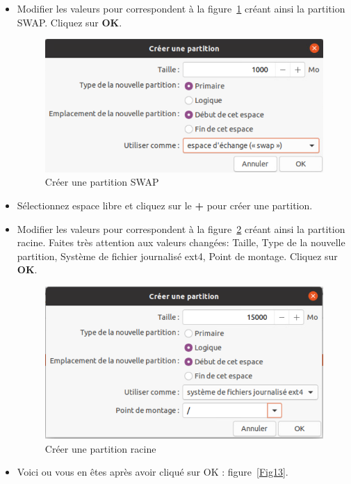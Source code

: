\begin{itemize}
		\item Modifier les valeurs pour correspondent à la figure~\ref{Fig11} créant ainsi la partition SWAP. Cliquez sur\textbf{ OK}.
		
		\begin{figure}[!htb]
			\centering
			\caption{\label{Fig11}Créer une partition SWAP}
			\includegraphics[scale=0.49]{images/Capture13}
		\end{figure}
		
		\item Sélectionnez espace libre et cliquez sur le  \textbf{+} pour créer une partition. 
		\item Modifier les valeurs pour correspondent à la figure~\ref{Fig12} créant ainsi la partition racine. {\color{blue}Faites très attention aux valeurs changées}: Taille, Type de la nouvelle partition, Système de fichier journalisé ext4, Point de montage. Cliquez sur\textbf{ OK}.
		
		\begin{figure}[!htb]
			\centering
			\caption{\label{Fig12}Créer une partition racine}
			\includegraphics[scale=0.49]{images/Capture14}
		\end{figure}
		
		
		\item Voici ou vous en êtes après avoir cliqué sur OK : figure~\ref{Fig13}.
		

\end{itemize}
